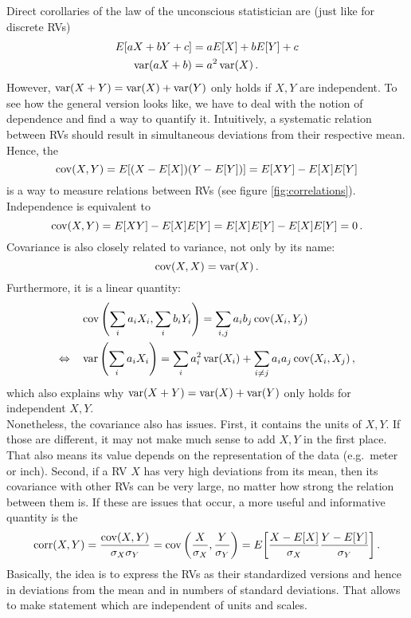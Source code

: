 Direct corollaries of the law of the unconscious statistician are (just like for discrete RVs)
\begin{align*}
E[a X + b Y + c] &= a E[X] + b E[Y] + c
\\
\operatorname{var}(a X + b) &= a^2 \operatorname{var}(X) \, .
\end{align*}
However, $\operatorname{var}(X + Y) = \operatorname{var}(X) + \operatorname{var}(Y)$ only holds if $X, Y$ are independent. To see how the general version looks like, we have to deal with the notion of dependence and find a way to quantify it. Intuitively, a systematic relation between RVs should result in simultaneous deviations from their respective mean. Hence, the 
\begin{equation}
\operatorname{cov}(X, Y) = E[(X - E[X]) (Y - E[Y])] = E[X Y] - E[X] E[Y]
\end{equation}
is a way to measure relations between RVs (see figure \ref{fig:correlations}). Independence is equivalent to
\begin{equation}
\operatorname{cov}(X, Y) = E[X Y] - E[X] E[Y] = E[X] E[Y] - E[X] E[Y] = 0 \, .
\end{equation}
Covariance is also closely related to variance, not only by its name:
\begin{equation}
\operatorname{cov}(X, X) = \operatorname{var}(X) \, .
\end{equation}
Furthermore, it is a linear quantity:
\begin{equation}
\begin{split}
&\operatorname{cov}\qty(\sum_i a_i X_i, \sum_i b_i Y_i) = \sum_{i, j} a_i b_j \operatorname{cov}(X_i, Y_j)
\\
\Leftrightarrow \quad &\operatorname{var}\qty(\sum_i a_i X_i) = \sum_i a_i^2 \operatorname{var}(X_i) + \sum_{i \neq j} a_i a_j \operatorname{cov}(X_i, X_j) \, ,
\end{split}
\end{equation}
which also explains why $\operatorname{var}(X + Y) = \operatorname{var}(X) + \operatorname{var}(Y)$ only holds for independent $X, Y$.\\


Nonetheless, the covariance also has issues. First, it contains the units of $X, Y$. If those are different, it may not make much sense to add $X, Y$ in the first place. That also means its value depends on the representation of the data (e.g.~meter or inch). Second, if a RV $X$ has very high deviations from its mean, then its covariance with other RVs can be very large, no matter how strong the relation between them is. If these are issues that occur, a more useful and informative quantity is the 
\begin{equation}
\operatorname{corr}(X, Y) = \frac{\operatorname{cov}(X, Y)}{\sigma_X \sigma_Y} = \operatorname{cov}\qty(\frac{X}{\sigma_X}, \frac{Y}{\sigma_Y})
= E\qty[\frac{X - E[X]}{\sigma_X} \frac{Y - E[Y]}{\sigma_Y}] \, .
\end{equation}
Basically, the idea is to express the RVs as their standardized versions and hence in deviations from the mean and in numbers of standard deviations. That allows to make statement which are independent of units and scales.\\



